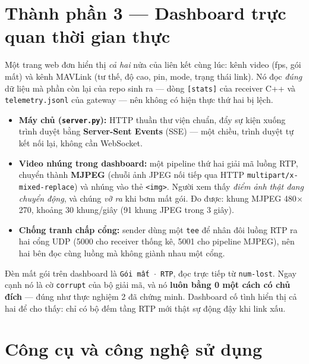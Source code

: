 \documentclass[12pt]{ai_conquer2026}
\begin{document}
\section{Thành phần 3 --- Dashboard trực quan thời gian thực}

Một trang web đơn hiển thị \emph{cả hai} nửa của liên kết cùng lúc: kênh video
(fps, gói mất) và kênh MAVLink (tư thế, độ cao, pin, mode, trạng thái link). Nó
đọc \emph{đúng} dữ liệu mà phần còn lại của repo sinh ra --- dòng \texttt{[stats]}
của receiver C++ và \texttt{telemetry.jsonl} của gateway --- nên không có hiện
thực thứ hai bị lệch.

\begin{itemize}
\item \textbf{Máy chủ (\texttt{server.py}):} HTTP thuần thư viện chuẩn, đẩy sự
      kiện xuống trình duyệt bằng \textbf{Server-Sent Events} (SSE) --- một chiều,
      trình duyệt tự kết nối lại, không cần WebSocket.
\item \textbf{Video nhúng trong dashboard:} một pipeline thứ hai giải mã luồng
      RTP, chuyển thành \textbf{MJPEG} (chuỗi ảnh JPEG nối tiếp qua HTTP
      \texttt{multipart/x-mixed-replace}) và nhúng vào thẻ \texttt{<img>}. Người
      xem thấy \emph{điểm ảnh thật đang chuyển động}, và chúng \emph{vỡ ra} khi
      bơm mất gói. Đo được: khung MJPEG 480$\times$270, khoảng 30 khung/giây
      (91 khung JPEG trong 3 giây).
\item \textbf{Chống tranh chấp cổng:} sender dùng một \texttt{tee} để nhân đôi
      luồng RTP ra hai cổng UDP (5000 cho receiver thống kê, 5001 cho pipeline
      MJPEG), nên hai bên đọc cùng luồng mà không giành nhau một cổng.
\end{itemize}

\begin{aivncodebox}
Đèn mất gói trên dashboard là \texttt{Gói mất $\cdot$ RTP}, đọc trực tiếp từ
\texttt{num-lost}. Ngay cạnh nó là cờ \texttt{corrupt} của bộ giải mã, và nó
\textbf{luôn bằng 0 một cách có chủ đích} --- đúng như thực nghiệm 2 đã chứng
minh. Dashboard cố tình hiển thị cả hai để cho thấy: chỉ có bộ đếm tầng RTP mới
thật sự động đậy khi link xấu.
\end{aivncodebox}

\section{Công cụ và công nghệ sử dụng}
\end{document}
